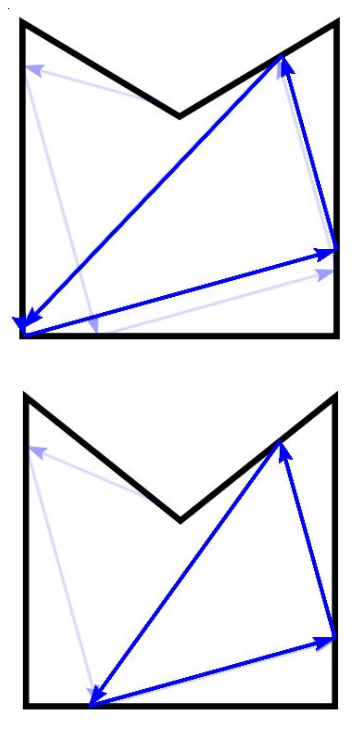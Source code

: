 \documentclass[]{article}  %
\begin{document}
\begin{figure}
\centering
\begin{subfigure}{0.33\textwidth}
  \includegraphics[width=\textwidth]{figures/poly1_limit_cycles.jpg}
\end{subfigure}%
\begin{subfigure}{0.33\textwidth}
  \includegraphics[width=\linewidth]{figures/poly3_limit_cycles.jpg}

\end{subfigure}
\end{figure}
\end{document}

